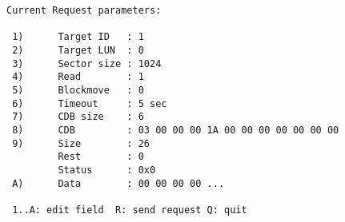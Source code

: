 \begin{screendump}
  \begin{verbatim}
Current Request parameters:

 1)      Target ID   : 1
 2)      Target LUN  : 0
 3)      Sector size : 1024
 4)      Read        : 1
 5)      Blockmove   : 0
 6)      Timeout     : 5 sec
 7)      CDB size    : 6
 8)      CDB         : 03 00 00 00 1A 00 00 00 00 00 00 00
 9)      Size        : 26
         Rest        : 0
         Status      : 0x0
 A)      Data        : 00 00 00 00 ...

 1..A: edit field  R: send request Q: quit
  \end{verbatim}
\end{screendump}
